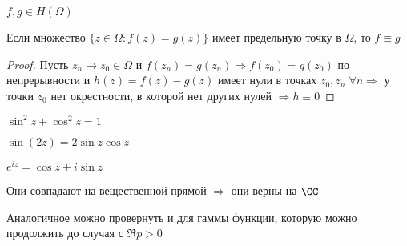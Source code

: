 \begin{theorem}\thmslashn
	
	$f, g \in H(\Omega)$
	
	Если множество $\{ z \in \Omega: f(z) = g(z)\}$ имеет предельную точку в $\Omega$, то $f\equiv g$
	
\end{theorem}

\begin{proof}\thmslashn
	
	Пусть $z_n \to z_0 \in \Omega$ и $f(z_n) = g(z_n) \Rightarrow f(z_0) = g(z_0)$ по непрерывности и $h(z) = f(z) - g(z)$ имеет нули в точках $z_0, z_n \; \forall n \Rightarrow$ у точки $z_0$ нет окрестности, в которой нет других нулей $\Rightarrow h\equiv 0$ 
\end{proof}

\begin{consequence}\thmslashn
	
	$\sin^2z + \cos^2 z = 1$
	
	$\sin(2z) = 2\sin z \cos z$
	
	$e^{iz} = \cos z + i \sin z$
	
	Они совпадают на вещественной прямой $\Rightarrow$ они верны на $\CC$
	
	Аналогичное можно провернуть и для гаммы функции, которую можно продолжить до случая с $\Re p > 0$
	
\end{consequence}